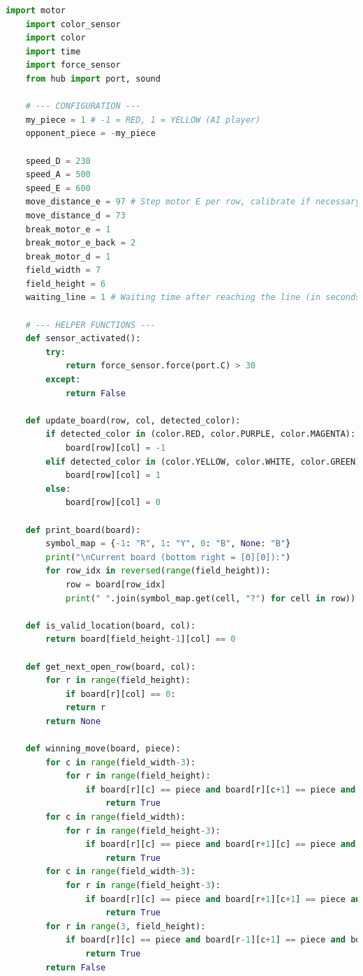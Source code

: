 \setcounter{chapter}{1}
\label{cha:Anhang_A}

\begin{lstlisting}[language=Python]
	import motor
	import color_sensor
	import color
	import time
	import force_sensor
	from hub import port, sound
	
	# --- CONFIGURATION ---
	my_piece = 1 # -1 = RED, 1 = YELLOW (AI player)
	opponent_piece = -my_piece
	
	speed_D = 230
	speed_A = 500
	speed_E = 600
	move_distance_e = 97 # Step motor E per row, calibrate if necessary!
	move_distance_d = 73
	break_motor_e = 1
	break_motor_e_back = 2
	break_motor_d = 1
	field_width = 7
	field_height = 6
	waiting_line = 1 # Waiting time after reaching the line (in seconds)
	
	# --- HELPER FUNCTIONS ---
	def sensor_activated():
		try:   
			return force_sensor.force(port.C) > 30
		except:
			return False
		
	def update_board(row, col, detected_color):
		if detected_color in (color.RED, color.PURPLE, color.MAGENTA):
			board[row][col] = -1
		elif detected_color in (color.YELLOW, color.WHITE, color.GREEN):
			board[row][col] = 1
		else:
			board[row][col] = 0
	
	def print_board(board):
		symbol_map = {-1: "R", 1: "Y", 0: "B", None: "B"} 
		print("\nCurrent board (bottom right = [0][0]):")
		for row_idx in reversed(range(field_height)):
			row = board[row_idx]
			print(" ".join(symbol_map.get(cell, "?") for cell in row))
		
	def is_valid_location(board, col):
		return board[field_height-1][col] == 0
	
	def get_next_open_row(board, col):
		for r in range(field_height):
			if board[r][col] == 0:
			return r
		return None
	
	def winning_move(board, piece):
		for c in range(field_width-3):
			for r in range(field_height):
				if board[r][c] == piece and board[r][c+1] == piece and board[r][c+2] == piece and board[r][c+3] == piece:
					return True
		for c in range(field_width):
			for r in range(field_height-3):
				if board[r][c] == piece and board[r+1][c] == piece and board[r+2][c] == piece and board[r+3][c] == piece:
					return True
		for c in range(field_width-3):
			for r in range(field_height-3):
				if board[r][c] == piece and board[r+1][c+1] == piece and board[r+2][c+2] == piece and board[r+3][c+3] == piece:
					return True
		for r in range(3, field_height):
			if board[r][c] == piece and board[r-1][c+1] == piece and board[r-2][c+2] == piece and board[r-3][c+3] == piece:
				return True	
		return False
	

\end{lstlisting}
